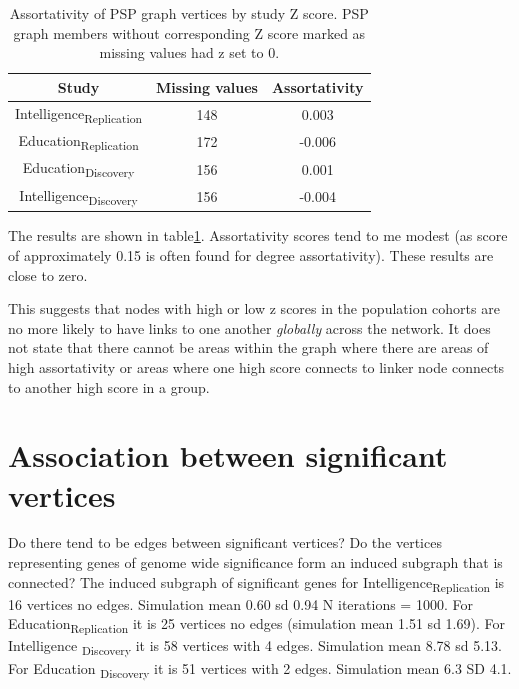  \begin{table}[]
     \centering
     \begin{tabular}{ccc}
     \toprule
         Study & Missing values  & Assortativity\\
         \midrule
         Intelligence\textsubscript{Replication} & 148 & 0.003\\
         Education\textsubscript{Replication} & 172 & -0.006\\
         Education\textsubscript{Discovery} & 156 & 0.001\\
         Intelligence\textsubscript{Discovery} & 156 & -0.004\\
         \bottomrule
     \end{tabular}
     \caption{Assortativity of PSP graph vertices by study Z score. PSP graph members without corresponding Z score marked as missing values had z set to 0.}
     \label{tab:Assortativity of PSP graph and z scores}
 \end{table}


The results are shown in table\ref{tab:Assortativity of PSP graph and z scores}. Assortativity scores tend to me modest (as score of approximately 0.15 is often found for degree assortativity). These results are close to zero. 

This suggests that nodes with high or low z scores in the population cohorts are no more likely to have links to one another \textit{globally} across the network. It does not state that there cannot be areas within the graph where there are areas of high assortativity or areas where one high score connects to linker node connects to another high score in a group.

\section{Association between significant vertices}
Do there tend to be edges between significant vertices? Do the vertices representing genes of genome wide significance form an induced subgraph that is connected?
The induced subgraph of significant genes for Intelligence\textsubscript{Replication} is 16 vertices no edges. Simulation mean 0.60 sd 0.94 N iterations = 1000. For Education\textsubscript{Replication} it is 25 vertices no edges (simulation mean 1.51 sd 1.69). For Intelligence \textsubscript{Discovery} it is 58 vertices with 4 edges. Simulation mean 8.78 sd 5.13. For Education \textsubscript{Discovery} it is 51 vertices with 2 edges. Simulation mean 6.3 SD 4.1.

